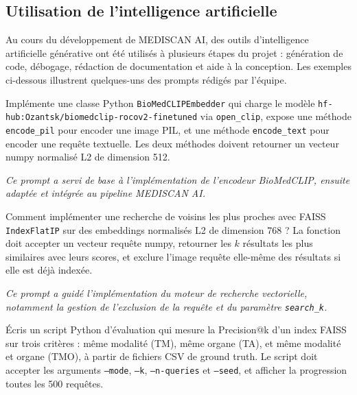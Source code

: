 \documentclass[12pt,a4paper]{article}
\begin{document}
\subsection{Utilisation de l'intelligence artificielle}

\noindent Au cours du développement de MEDISCAN AI, des outils d'intelligence
artificielle générative ont été utilisés à plusieurs étapes du projet :
génération de code, débogage, rédaction de documentation et aide à la
conception. Les exemples ci-dessous illustrent quelques-uns des prompts
rédigés par l'équipe.

\vspace{0.4cm}

\begin{promptbox}
Implémente une classe Python \texttt{BioMedCLIPEmbedder} qui charge le modèle
\texttt{hf-hub:Ozantsk/biomedclip-rocov2-finetuned} via \texttt{open\_clip},
expose une méthode \texttt{encode\_pil} pour encoder une image PIL, et une
méthode \texttt{encode\_text} pour encoder une requête textuelle. Les deux
méthodes doivent retourner un vecteur numpy normalisé L2 de dimension 512.
\end{promptbox}

\textit{Ce prompt a servi de base à l'implémentation de l'encodeur BioMedCLIP,
ensuite adaptée et intégrée au pipeline MEDISCAN AI.}

\vspace{0.5cm}

\begin{promptbox}
Comment implémenter une recherche de voisins les plus proches avec FAISS
\texttt{IndexFlatIP} sur des embeddings normalisés L2 de dimension 768 ?
La fonction doit accepter un vecteur requête numpy, retourner les $k$ résultats
les plus similaires avec leurs scores, et exclure l'image requête elle-même
des résultats si elle est déjà indexée.
\end{promptbox}

\textit{Ce prompt a guidé l'implémentation du moteur de recherche vectorielle,
notamment la gestion de l'exclusion de la requête et du paramètre \texttt{search\_k}.}

\vspace{0.5cm}

\begin{promptbox}
Écris un script Python d'évaluation qui mesure la Precision@k d'un index FAISS
sur trois critères : même modalité (TM), même organe (TA), et même modalité et
organe (TMO), à partir de fichiers CSV de ground truth. Le script doit accepter
les arguments \texttt{--mode}, \texttt{--k}, \texttt{--n-queries} et
\texttt{--seed}, et afficher la progression toutes les 500 requêtes.
\end{promptbox}
\end{document}
